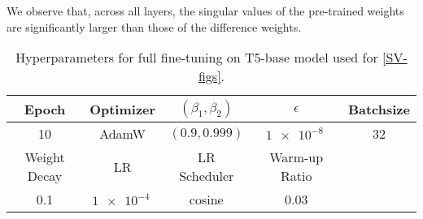 We observe that, across all layers, the singular values of the pre-trained weights are significantly larger than those of the difference weights.
\begin{table}[h!]
    \caption{Hyperparameters for full fine-tuning on T5-base model used for \cref{SV-figs}.}
    \label{tab:sv_config}
    \centering
    \begin{tabular}{ccccc}
    \toprule
    Epoch & Optimizer & $(\beta_1, \beta_2)$ & $\epsilon$ & Batchsize \\
    \midrule
    10 & AdamW & $(0.9, 0.999)$ & $\SI{1e-8}{}$ & 32 \\
    \midrule
    Weight Decay & LR & LR Scheduler & Warm-up Ratio & \\
    \midrule
    0.1 & $\SI{1e-4}{}$ & cosine & 0.03 & \\
    \bottomrule
    \end{tabular}
\end{table}